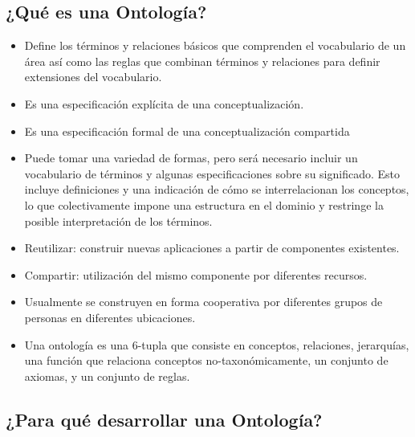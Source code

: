 \documentclass[a4paper,12pt,twoside,final,spanish]{article}
\begin{document}
\subsection{¿Qué es una Ontología?}

\begin{itemize}
\item Define los términos y relaciones básicos que comprenden el vocabulario de un área así como las reglas que combinan términos y relaciones para definir extensiones del vocabulario.

\item Es una especificación explícita de una conceptualización.

\item Es una especificación formal de una conceptualización compartida

\item Puede tomar una variedad de formas, pero será necesario incluir un vocabulario de términos y algunas especificaciones sobre su significado. Esto incluye definiciones y una indicación de cómo se interrelacionan los conceptos, lo que colectivamente impone una estructura  en el dominio y restringe la posible interpretación de los términos.

\item Reutilizar: construir nuevas aplicaciones a partir de componentes existentes.

\item Compartir: utilización del mismo componente por diferentes recursos.

\item Usualmente se construyen en forma cooperativa por diferentes grupos de personas en diferentes ubicaciones.

\item Una ontología es una 6-tupla que consiste en conceptos, relaciones, jerarquías, una función que relaciona conceptos no-taxonómicamente, un conjunto de axiomas, y un conjunto de reglas.
\end{itemize}

\subsection{¿Para qué desarrollar una Ontología?}
\end{document}
